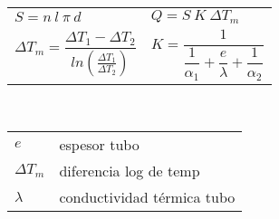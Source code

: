 \documentclass[11pt,a4paper]{article}
\begin{document}
\begin{cajita}
\begin{multicols}{2}
			\renewcommand{\arraystretch}{1.5}
			\begin{tabular}{l l}
				$S=n~l~\pi~d$ &	$Q=S~K~\Delta T_m$\\[0.2cm]
				$\Delta T_m = \dfrac {\Delta T_1 - \Delta T_2}{ln\left(\frac{\Delta T_1}{\Delta T_2}\right)}$ & $K=\dfrac{1}{\dfrac{1}{\alpha_1}+\dfrac{e}{\lambda}+\dfrac{1}{\alpha_2}}$\\
			\end{tabular}\\
			\renewcommand{\arraystretch}{1}
			\begin{tabular}{@{}p{1cm}@{}@{}p{7cm}@{}}
				$e$& espesor tubo\\
				$\Delta T_m$ & diferencia log de temp\\
				$\lambda$ & conductividad térmica tubo\\

			\end{tabular}
		\end{multicols}



\end{cajita}
\end{document}
